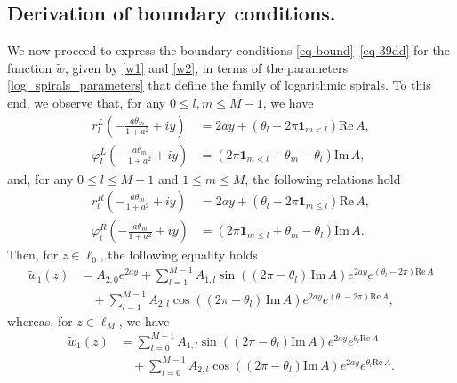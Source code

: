 \documentclass[11pt, letterpaper, reqno]{amsart}
\numberwithin{equation}{section}
\theoremstyle{definition}
\theoremstyle{plain}
\numberwithin{equation}{section}
\begin{document}
\subsection{Derivation of boundary conditions.} We now proceed to express the boundary conditions \eqref{eq-bound}–\eqref{eq-39dd} for the function $\tilde w$, given by \eqref{w1} and \eqref{w2}, in terms of the parameters \eqref{log_spirals_parameters} that define the family of logarithmic spirals. To this end, we observe that, for any $0\le l,m \le M-1$, we have
\begin{equation}
\begin{aligned}\label{eq-b-l}
r_{l}^{L}\left(-\frac{a\theta_{m}}{1+a^{2}}+iy\right) & = 2ay + (\theta_{l} - 2\pi\mathbf{1}_{m<l})\mathrm{Re}\,A, \\[2pt] 
\varphi_{l}^{L}\left(-\frac{a\theta_{m}}{1+a^{2}}+iy\right) & = (2\pi\mathbf{1}_{m<l} + \theta_{m} - \theta_{l})\mathrm{Im}\,A,
\end{aligned}
\end{equation}
and, for any $0\le l\le M-1$ and $1\le m \le M$, the following relations hold
\begin{equation}
\begin{aligned}\label{eq-b-r}
r_{l}^{R}\left(-\frac{a\theta_{m}}{1+a^{2}}+iy\right) & = 2ay + (\theta_{l} - 2\pi\mathbf{1}_{m\le l})\mathrm{Re}\,A, \\[2pt]
\varphi_{l}^{R}\left(-\frac{a\theta_{m}}{1+a^{2}}+iy\right) & = (2\pi\mathbf{1}_{m\le l} + \theta_{m} - \theta_{l})\mathrm{Im}\,A.
\end{aligned}
\end{equation}
Then, for $z\in\ell_{0}$, the following equality holds
\begin{equation}
\begin{aligned}\label{b-1}
\tilde w_{1}(z) & = A_{2,0}e^{2ay} + \sum_{l=1}^{M-1} A_{1,l}\sin\left((2\pi-\theta_{l})\,\mathrm{Im}\,A\right)e^{2ay}e^{(\theta_{l}-2\pi)\mathrm{Re}\,A} \\
& \quad + \sum_{l=1}^{M-1} A_{2,l}\cos\left((2\pi-\theta_{l})\,\mathrm{Im}\,A\right)e^{2ay}e^{(\theta_{l}-2\pi)\mathrm{Re}\,A},
\end{aligned}
\end{equation}
whereas, for $z\in\ell_{M}$, we have
\begin{equation}\label{b-2}
\begin{aligned}
\tilde w_{1}(z) & = \sum_{l=0}^{M-1}A_{1,l}\sin\left((2\pi-\theta_{l})\mathrm{Im}\,A\right)e^{2ay}e^{\theta_{l}\mathrm{Re}\,A} \\
&\quad + \sum_{l=0}^{M-1}A_{2,l}\cos\left((2\pi-\theta_{l})\mathrm{Im}\,A\right)e^{2ay}e^{\theta_{l}\mathrm{Re}\,A}.
\end{aligned}
\end{equation}
\end{document}
